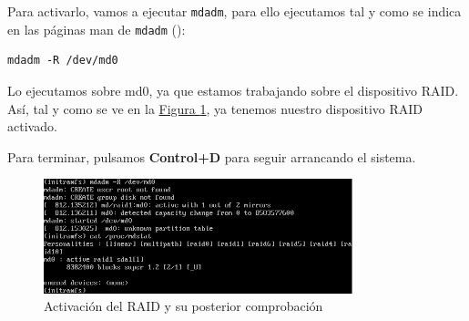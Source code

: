 \documentclass[10pt,a4paper,spanish]{article}
\numberwithin{equation}{section} %
\numberwithin{figure}{section} %
\numberwithin{table}{section} %
\begin{document}
Para activarlo, vamos a ejecutar \texttt{mdadm}, para ello ejecutamos tal y como se indica en las páginas man de \texttt{mdadm} (\cite{mdadm}):

\begin{verbatim}
mdadm -R /dev/md0
\end{verbatim}

Lo ejecutamos sobre md0, ya que estamos trabajando sobre el dispositivo RAID. Así, tal y como se ve en la \hyperref[active]{Figura \ref*{active}}, ya tenemos nuestro dispositivo RAID activado. 

Para terminar, pulsamos \textbf{Control+D} para seguir arrancando el sistema.

\begin{figure}[!h]
\centering
\includegraphics[width=0.8\textwidth]{9}
\caption{Activación del RAID y su posterior comprobación}
\label{active}
\end{figure}
\end{document}
